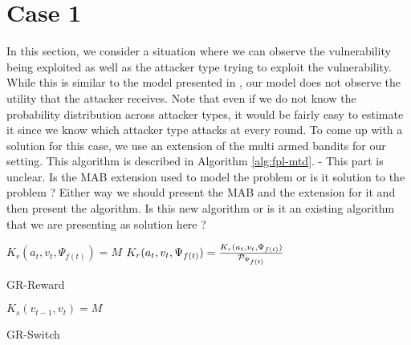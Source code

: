 \section{Case 1}\label{sec:case1}
In this section, we consider a situation where we can observe the vulnerability being exploited as well as the attacker type trying to exploit the vulnerability. While this is similar to the model presented in \cite{sengupta2020bsmg}, our model does not observe the utility that the attacker receives.
Note that even if we do not know the probability distribution across attacker types, it would be fairly easy to estimate it since we know which attacker type attacks at every round. To come up with a solution for this case, we use an extension of the multi armed bandits for our setting. This algorithm is described in Algorithm \ref{alg:fpl-mtd}. - This part is unclear. Is the MAB extension used to model the problem or is it solution to the problem ? Either way we should present the MAB and the extension for it and then present the algorithm. Is this new algorithm or is it an existing algorithm that we are presenting as solution here ?

\begin{algorithm}
\DontPrintSemicolon
$K_r(a_t, v_t, \Psi_{f(t)}) = M$\;
$K_r(a_t, v_t, \Psi_{f(t)}) = \frac{K_r(a_t, v_t, \Psi_{f(t)})}{\cal P_{\Psi_{f(t)}}}$\;
\caption{GR-Reward}
\label{alg:gr-reward}
\end{algorithm}

\begin{algorithm}
\DontPrintSemicolon
$K_s(v_{t-1}, v_t) = M$\;
\caption{GR-Switch}
\label{alg:gr-switch}
\end{algorithm}

